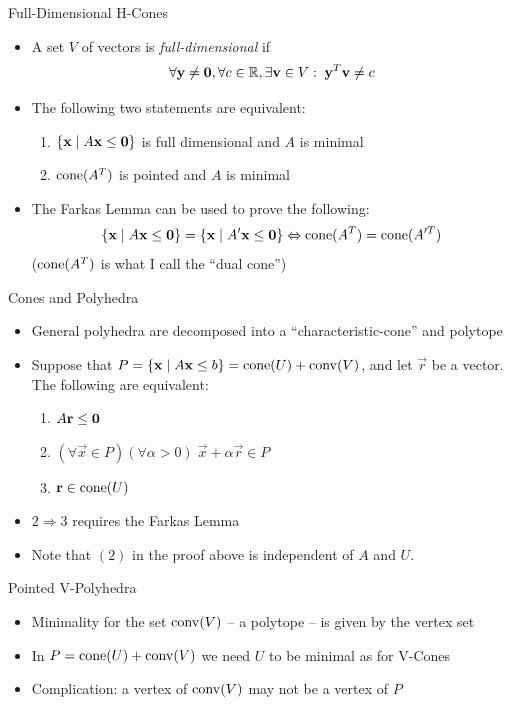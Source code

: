 \documentclass{beamer}
\begin{document}
\begin{frame}{Full-Dimensional H-Cones}
\begin{itemize}
  \item<1-> A set $V$ of vectors is \textit{full-dimensional} if 
  \[ \forall\mathbf{y}\neq\mathbf{0}, \forall c\in\mathbb{R}, \exists \mathbf{v} \in V:\; \mathbf{y}^T \mathbf{v} \neq c \]
  \item<2->The following two statements are equivalent:
    \begin{enumerate}
      \item $\left\{\mathbf{x}\;|\; A\mathbf{x}\leq\mathbf{0}\right\}$ is full dimensional and $A$ is minimal
      \item $\operatorname{cone}(A^T)$ is pointed and $A$ is minimal
    \end{enumerate}
  \item<3-> The Farkas Lemma can be used to prove the following: 
    \[\left\{\mathbf{x}\;|\; A\mathbf{x}\leq\mathbf{0}\right\} = \left\{\mathbf{x}\;|\; A'\mathbf{x}\leq\mathbf{0}\right\} \Leftrightarrow \operatorname{cone}(A^T) = \operatorname{cone}(A'^T)\]
    ($\operatorname{cone}(A^T)$ is what I call the ``dual cone'')
\end{itemize}
\end{frame}


\begin{frame}{Cones and Polyhedra}
\begin{itemize}
  \item<1-> General polyhedra are decomposed into a ``characteristic-cone'' and polytope
  \item<2-> Suppose that $P = \left\{\mathbf{x}\;|\; A\mathbf{x}\leq b\right\} = \operatorname{cone}(U) + \operatorname{conv}(V)$, and let $\vec{r}$ be a vector.  The following are equivalent:
    \begin{enumerate}
      \item $A\mathbf{r}\leq\mathbf{0}$
      \item $(\forall \vec{x}\in P)(\forall \alpha > 0)\;\vec{x} + \alpha\vec{r} \in P$
      \item $\mathbf{r} \in \operatorname{cone}(U)$
    \end{enumerate}
  \item<3-> $2 \Rightarrow 3$ requires the Farkas Lemma
  \item<4-> Note that $(2)$ in the proof above is independent of $A$ and $U$.
\end{itemize}
\end{frame}

\begin{frame}{Pointed V-Polyhedra}
\begin{itemize}
  \item<1-> Minimality for the set $\operatorname{conv}(V)$ -- a polytope -- is given by the vertex set
  \item<2-> In $P = \operatorname{cone}(U)+\operatorname{conv}(V)$ we need $U$ to be minimal as for V-Cones
  \item<3-> Complication: a vertex of $\operatorname{conv}(V)$ may not be a vertex of $P$
\end{itemize}
\end{frame}
\end{document}
